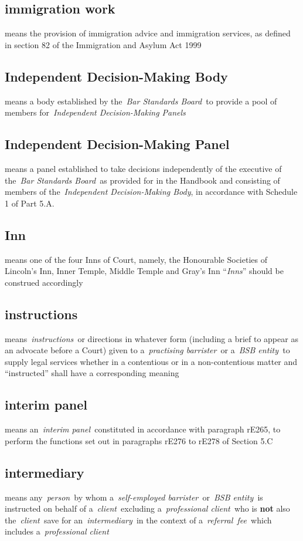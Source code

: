   
  \subsection{immigration work } means the provision of immigration advice
  and immigration services, as defined in section 82 of the Immigration
  and Asylum Act 1999
  \subsection{Independent Decision-Making Body } means a body established
  by the~\emph{Bar Standards Board~}to provide a pool of members
  for~\emph{Independent Decision-Making Panels} \subsection{Independent Decision-Making Panel } means a panel established
  to take decisions independently of the executive of the~\emph{Bar
  Standards Board~}as provided for in the Handbook and consisting of
  members of the~\emph{Independent Decision-Making Body}, in accordance
  with Schedule 1 of Part 5.A.  \subsection{Inn } means one of the four Inns of Court, namely, the
  Honourable Societies of Lincoln's Inn, Inner Temple, Middle Temple and
  Gray's Inn ``\emph{Inns}'' should be construed accordingly  \subsection{instructions } means~\emph{instructions~}or directions in
  whatever form (including a brief to appear as an advocate before a
  Court) given to a~\emph{practising barrister~}or a~\emph{BSB
  entity~}to supply legal services whether in a contentious or in a
  non-contentious matter and ``instructed'' shall have a corresponding
  meaning  \subsection{interim panel } means an~\emph{interim panel~}constituted in
  accordance with paragraph rE265, to perform the functions set out in
  paragraphs rE276 to rE278 of Section 5.C  \subsection{intermediary } means any~\emph{person~}by whom
  a~\emph{self-employed barrister~}or~\emph{BSB entity~}is instructed on
  behalf of a~\emph{client~}excluding a~\emph{professional client~}who
  is \textbf{not} also the~\emph{client~}save for an~\emph{intermediary~}in the
  context of a~\emph{referral~fee~}which includes a~\emph{professional
  client}
  
